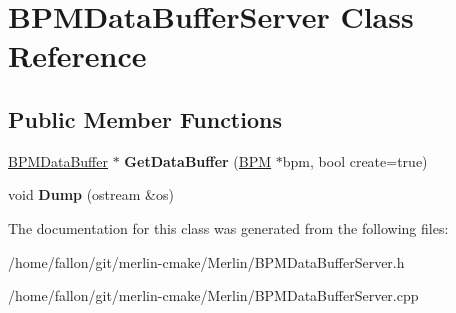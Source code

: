 \hypertarget{classBPMDataBufferServer}{}\section{B\+P\+M\+Data\+Buffer\+Server Class Reference}
\label{classBPMDataBufferServer}
\subsection*{Public Member Functions}
\begin{DoxyCompactItemize}
\item 
\mbox{\label{classBPMDataBufferServer_abf194b7ad1b0ebea5d160b8dce57af5a}} 
\hyperlink{classBPMDataBuffer}{B\+P\+M\+Data\+Buffer} $\ast$ {\bfseries Get\+Data\+Buffer} (\hyperlink{classBPM}{B\+PM} $\ast$bpm, bool create=true)
\item 
\mbox{\label{classBPMDataBufferServer_aeb249391dcc08b5dd055ce48e221afd8}} 
void {\bfseries Dump} (ostream \&os)
\end{DoxyCompactItemize}


The documentation for this class was generated from the following files\+:\begin{DoxyCompactItemize}
\item 
/home/fallon/git/merlin-\/cmake/\+Merlin/B\+P\+M\+Data\+Buffer\+Server.\+h\item 
/home/fallon/git/merlin-\/cmake/\+Merlin/B\+P\+M\+Data\+Buffer\+Server.\+cpp\end{DoxyCompactItemize}
